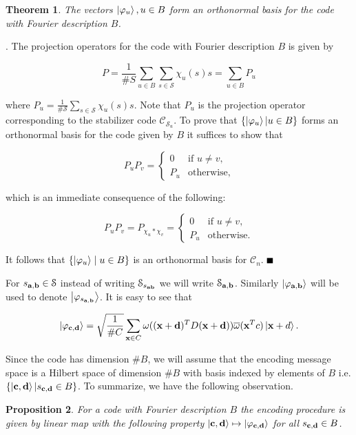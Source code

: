 \documentclass{Rinton-P9x6}
\newtheorem{theorem}{Theorem}[section]
\newtheorem{proposition}[theorem]{Proposition}
\newcommand {\ket} [1] {\ensuremath \left\vert#1\ensuremath \right\rangle}
\newcommand{\bproof}{\noindent{\it Proof}}
\newcommand{\eproof}{\hspace*{\fill}$\rule{2mm}{2mm}$~~~~~\bigskip}
\renewenvironment{proof}{\bproof. }{\eproof}
\renewcommand{\a}{{\bf a}}
\renewcommand{\b}{{\bf b}}
\renewcommand{\c}{{\bf c}}
\renewcommand{\d}{{\bf d}}
\newcommand{\C}{{\ensuremath{\mathcal{C}}}}
\renewcommand{\S}{{\ensuremath{\mathcal{S}}}}
\begin{document}
\begin{theorem}\label{onbasis}
  The vectors $\ket{\varphi_u}, u \in B$ form an orthonormal basis
  for the code with Fourier description $B$.
\end{theorem}

\begin{proof}
  The projection operators for the code with Fourier description $B$
  is given by 

\[
P = \frac{1}{\#S} \sum_{u \in B} \sum_{s \in \S} \chi_u(s) s = \sum_{u
  \in B} P_u
\] 

where $P_u = \frac{1}{\#\S} \sum_{s \in \S} \chi_u(s) s$. Note that
$P_u$ is the projection operator corresponding to the
stabilizer code $\mathcal{C}_{\S_u}$. To prove that $\{\ket{\varphi_u}
| u \in B\}$ forms an orthonormal basis for the code given by $B$ it
suffices to show that
  
\[
  P_u P_v = 
\left\{
\begin{array}{cc}
    0&\textrm{if } u \neq v, \\
    P_u&\textrm{otherwise,}
\end{array}
\right.
\]
  
which is an immediate consequence of the following:
  
\[
  P_u P_v = P_{\chi_u * \chi_v} = \left\{\begin{array}{cc}
      0&\textrm{if } u \neq v,\\
      P_u&\textrm{otherwise.}
    \end{array}
  \right. 
\]

It follows that $\{\ket{\varphi_u}\mid u \in B\}$ is an orthonormal
basis for $\C_n$.
\end{proof}

For $s_{\a,\b} \in \S$ instead of writing $\S_{s_{\a\b}}$ we will
write $\S_{\a,\b}$. Similarly $\ket{\varphi_{\a,\b}}$ will be used to
denote $\ket{\varphi_{s_{\a,\b}}}$. It is easy to see that

\[
\ket{\varphi_{\c,\d}} = \sqrt{\frac{1}{\# C}}\sum_{{\bf x} \in C}
\omega(({\bf x} +\d)^T D ({\bf x} + \d) ) \overline{\omega}({\bf x}^T
c) \ket{{\bf x} + d} .
\]

Since the code has dimension $\# B$, we will assume that the encoding
message space is a Hilbert space of dimension $\# B$ with basis 
indexed by elements of $B$ i.e. $\{ \ket{\c,\d} | s_{\c,\d} \in B\}$.
To summarize, we have the following observation.

\begin{proposition}
  For a code with Fourier description $B$ the encoding procedure
  is given by linear map with the following property $\ket{\c,\d}
  \mapsto \ket{\varphi_{\c,\d}}$ for all $s_{\c,\d} \in B$.
\end{proposition}
\end{document}
